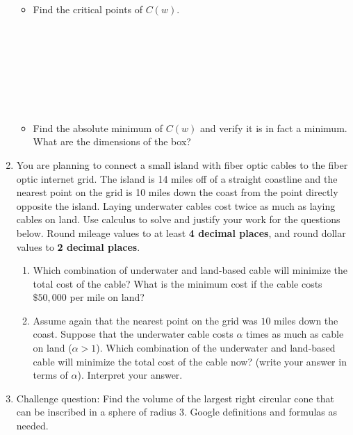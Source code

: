 \documentclass[12pt]{article}
\begin{document}
\begin{enumerate}
\begin{itemize}
        \item Find the critical points of $C(w)$.\\\\\\\\\\\\\\\\
        
        \item Find the absolute minimum of $C(w)$ and verify it is in fact a minimum. What are the dimensions of the box?
    \end{itemize}

    \newpage
    \item You are planning to connect a small island with fiber optic cables to the fiber optic internet grid. The island is 14 miles off of a straight coastline and the nearest point on the grid is 10 miles down the coast from the point directly opposite the island. Laying underwater cables cost twice as much as laying cables on land. Use calculus to solve and justify your work for the questions below. Round mileage values to at least \textbf{4 decimal places}, and round dollar values to \textbf{2 decimal places}.
    \begin{enumerate}[label=(\alph*)]
        \item Which combination of underwater and land-based cable will minimize the total cost of the cable? What is the minimum cost if the cable costs $\$50,000$ per mile on land?

        \vspace{4in}
        
        \newpage
        \item Assume again that the nearest point on the grid was $10$ miles down the coast. Suppose that the underwater cable costs $\alpha$ times as much as cable on land ($\alpha>1$). Which combination of the underwater and land-based cable will minimize the total cost of the cable now? (write your answer in terms of $\alpha$). Interpret your answer.
    \end{enumerate}
\vspace{7in}
\item Challenge question: Find the volume of the largest right circular cone that can be inscribed in a sphere of radius $3$. Google definitions and formulas as needed.

        
    
\end{enumerate}
\end{document}
